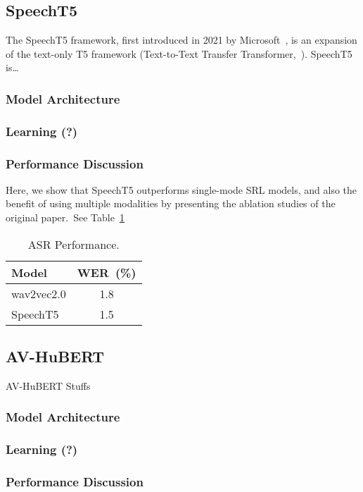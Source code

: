 \documentclass[11pt]{article}
\begin{document}
\subsection{SpeechT5}

The SpeechT5 framework, first introduced in 2021 by Microsoft~\cite{speecht5}, is an expansion of the text-only T5 framework (Text-to-Text Transfer Transformer,~). SpeechT5 is\dots

\subsubsection{Model Architecture}
\subsubsection{Learning (?)}
\subsubsection{Performance Discussion}

Here, we show that SpeechT5 outperforms single-mode SRL models, and also the benefit of using multiple modalities by presenting the ablation studies of the original paper.~See Table~\ref{table:speecht5_performance}

\begin{table}
    \centering
    \begin{tabular}{lc}
    \hline
    \textbf{Model} & \textbf{WER~(\%)}\\
    \hline
    wav2vec2.0 & 1.8\\
    SpeechT5 & 1.5\\
    \hline
    \end{tabular}
    \caption{\label{table:speecht5_performance}ASR Performance.}
\end{table}

\subsection{AV-HuBERT}

AV-HuBERT Stuffs

\subsubsection{Model Architecture}
\subsubsection{Learning (?)}
\subsubsection{Performance Discussion}
\end{document}
